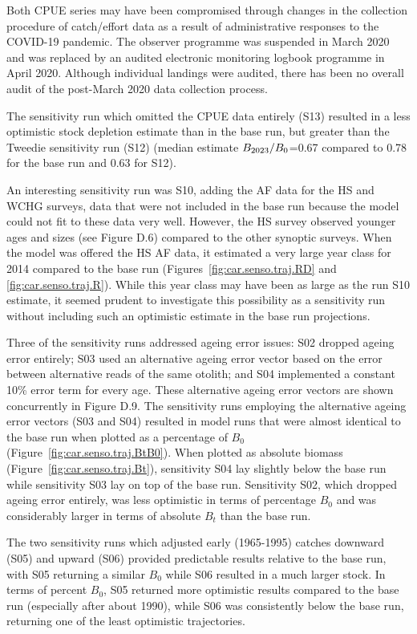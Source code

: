 \documentclass[11pt]{book}
\newcommand{\pc}{\%}
\begin{document}
Both CPUE series may have been compromised through changes in the collection procedure of catch/effort data as a result of administrative responses to the COVID-19 pandemic.
The observer programme was suspended in March 2020 and was replaced by an audited electronic monitoring logbook programme in April 2020.
Although individual landings were audited, there has been no overall audit of the post-March 2020 data collection process.

The sensitivity run which omitted the CPUE data entirely (S13) resulted in a less optimistic stock depletion estimate than in the base run, but greater than the Tweedie sensitivity run (S12) (median estimate $B_{2023}/B_0$=0.67 compared to 0.78 for the base run and 0.63 for S12).

An interesting sensitivity run was S10, adding the AF data for the HS and WCHG surveys, data that were not included in the base run because the model could not fit to these data very well.
However, the HS survey observed younger ages and sizes (see Figure D.6) compared to the other synoptic surveys.
When the model was offered the HS AF data, it estimated a very large year class for 2014 compared to the base run (Figures~\ref{fig:car.senso.traj.RD} and \ref{fig:car.senso.traj.R}).
While this year class may have been as large as the run S10 estimate, it seemed prudent to investigate this possibility as a sensitivity run without including such an optimistic estimate in the base run projections.

Three of the sensitivity runs addressed ageing error issues: S02 dropped ageing error entirely; S03 used an alternative ageing error vector based on the error between alternative reads of the same otolith; and S04 implemented a constant 10\pc{} error term for every age.
These alternative ageing error vectors are shown concurrently in Figure D.9.
The sensitivity runs employing the alternative ageing error vectors (S03 and S04) resulted in model runs that were almost identical to the base run when plotted as a percentage of $B_0$ (Figure~\ref{fig:car.senso.traj.BtB0}).
When plotted as absolute biomass (Figure~\ref{fig:car.senso.traj.Bt}), sensitivity S04 lay slightly below the base run while sensitivity S03 lay on top of the base run.
Sensitivity S02, which dropped ageing error entirely, was less optimistic in terms of percentage $B_0$ and was considerably larger in terms of absolute $B_t$ than the base run.

The two sensitivity runs which adjusted early (1965-1995) catches downward (S05) and upward (S06) provided predictable results relative to the base run, with S05 returning a similar $B_0$ while S06 resulted in a much larger stock.
In terms of percent $B_0$, S05 returned more optimistic results compared to the base run (especially after about 1990), while S06 was consistently below the base run, returning one of the least optimistic trajectories.
\end{document}
